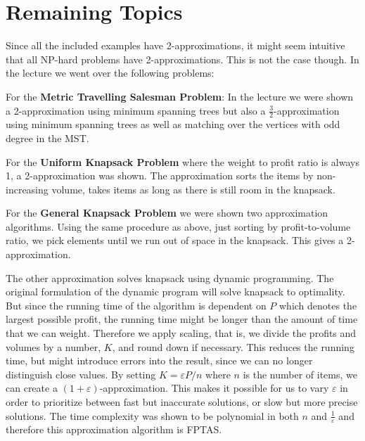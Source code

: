 \documentclass[a4paper]{article}
\begin{document}
	\section{Remaining Topics}
	Since all the included examples have 2-approximations, it might seem intuitive that all NP-hard problems have 2-approximations. This is not the case though. In the lecture we went over the following problems:
	
	\noindent For the \textbf{Metric Travelling Salesman Problem}: In the lecture we were shown a 2-approximation using minimum spanning trees but also a $\frac{3}{2}$-approximation using minimum spanning trees as well as matching over the vertices with odd degree in the MST.
	
	\noindent For the \textbf{Uniform Knapsack Problem} where the weight to profit ratio is always 1, a 2-approximation was shown. The approximation sorts the items by non-increasing volume, takes items as long as there is still room in the knapsack.
	
	\noindent For the \textbf{General Knapsack Problem} we were shown two approximation algorithms. Using the same procedure as above, just sorting by profit-to-volume ratio, we pick elements until we run out of space in the knapsack. This gives a 2-approximation.
	
	\noindent The other approximation solves knapsack using dynamic programming. The original formulation of the dynamic program will solve knapsack to optimality. But since the running time of the algorithm is dependent on $P$ which denotes the largest possible profit, the running time might be longer than the amount of time that we can weight. Therefore we apply scaling, that is, we divide the profits and volumes by a number, $K$, and round down if necessary. This reduces the running time, but might introduce errors into the result, since we can no longer distinguish close values. By setting $K = \varepsilon P/n$ where $n$ is the number of items, we can create a $(1+\varepsilon)$-approximation. This makes it possible for us to vary $\varepsilon$ in order to prioritize between fast but inaccurate solutions, or slow but more precise solutions. The time complexity was shown to be polynomial in both $n$ and $\frac{1}{\varepsilon}$ and therefore this approximation algorithm is FPTAS.
	
\end{document}
